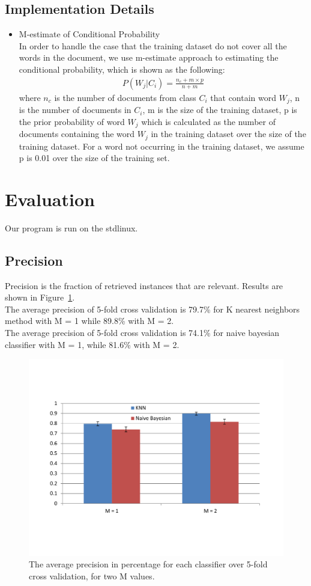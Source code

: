 \documentclass{article}
\begin{document}
\subsection{Implementation Details}
\begin{itemize}
\item M-estimate of Conditional Probability\\
In order to handle the case that the training dataset do not cover all the words in the document, we use m-estimate approach to estimating the conditional probability, which is shown as the following:
\begin{align*}
P(W_j|C_i) = \frac{n_c + m \times p}{n + m}
\end{align*}
where $n_c$ is the number of documents from class $C_i$ that contain word $W_j$, n is the number of documents in $C_i$, m is the size of the training dataset, p is the prior probability of word $W_j$ which is calculated as the number of documents containing the word $W_j$ in the training dataset over the size of the training dataset. For a word not occurring in the training dataset, we assume p is 0.01 over the size of the training set.
\end{itemize}
\section{Evaluation}
Our program is run on the stdlinux.
\subsection{Precision}
Precision is the fraction of retrieved instances that are relevant. Results are shown in Figure~\ref{Fig:prec}.\\
The average precision of 5-fold cross validation is 79.7\% for K nearest neighbors method with M = 1 while 89.8\% with M = 2.\\
The average precision of 5-fold cross validation is 74.1\% for naive bayesian classifier with M = 1, while 81.6\% with M = 2. 
\begin{figure}
\includegraphics[width=1.0\textwidth]{Precision}
\caption{The average precision in percentage for each classifier over 5-fold cross validation, for two M values. }
\label{Fig:prec}
\end{figure}
\end{document}
